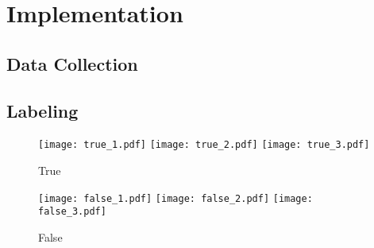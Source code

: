 \chapter{Implementation}\label{ch:implementation}\glsresetall



\section{Data Collection}

\section{Labeling}
\begin{figure}
    \centering
    \texttt{[image: true\_1.pdf]}
    \texttt{[image: true\_2.pdf]}
    \texttt{[image: true\_3.pdf]}
    \caption{True}
    \label{fig:label_true}
\end{figure}

\begin{figure}
    \centering
    \texttt{[image: false\_1.pdf]}
    \texttt{[image: false\_2.pdf]}
    \texttt{[image: false\_3.pdf]}
    \caption{False}
    \label{fig:label_false}
\end{figure}